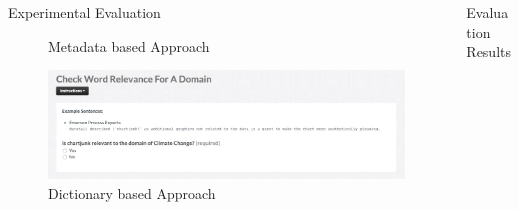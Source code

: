 \documentclass[final,hyperref={pdfpagelabels=true}]{beamer}
\begin{document}
\begin{frame}
\begin{columns}[t, onlytextwidth]
\begin{column}{\textwidth}
\begin{columns}[t, onlytextwidth]
\begin{column}{.49\textwidth}
\begin{block}{Experimental Evaluation}
\begin{minipage}[t][.23\textheight][c]{\textwidth}
\begin{minipage}[t]{0.93\textwidth}
\begin{minipage}[t]{\textwidth}
\begin{minipage}[t]{.49\textwidth}
\begin{minipage}[t]{\textwidth}
\begin{figure}[H]
											 \caption{Metadata based Approach}
										\end{figure}
									\end{minipage}
									\begin{minipage}[t]{\textwidth}
										\vspace{-1.9mm}
										\begin{figure}[H]
										 \centering
										 \includegraphics[width=\textwidth]{figures/questionaire_wordnik_example}
										 \caption{Dictionary based Approach}
										\end{figure}
									\end{minipage}
								\end{minipage}
							\end{minipage}
						\end{minipage}
						\hfill
						\hbox{}
						
					\end{minipage}
				\end{block}
			\end{column}
			\begin{column}{.49\textwidth}
				\begin{block}{Evaluation Results}
					\begin{minipage}[t][.23\textheight][c]{\textwidth}
						
						\hfill
						\begin{minipage}[t]{0.93\textwidth}
							\begin{minipage}[t]{\textwidth}
								\begin{minipage}[t]{.48\textwidth}
									\setlength\abovecaptionskip{0mm}
									\setlength\belowcaptionskip{0mm}
									

\end{minipage}
\end{minipage}
\end{minipage}
\end{minipage}
\end{block}
\end{column}
\end{columns}
\end{column}
\end{columns}
\end{frame}
\end{document}
